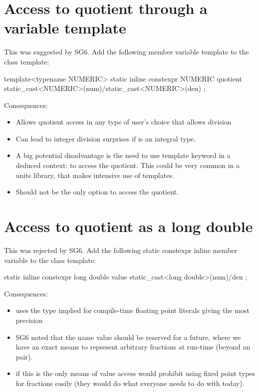 \documentclass[ebook,11pt,article]{memoir}
\begin{document}
\section{Access to quotient through a variable template}
This was suggested by SG6. Add the following member variable template to the  class template:
\begin{codeblock}
      template<typename NUMERIC>
      static inline constexpr NUMERIC quotient{
          static_cast<NUMERIC>(num)/static_cast<NUMERIC>(den)
      }; 
\end{codeblock}

Consequences:
\begin{itemize}
\item Allows quotient access in any type of user's choice that allows division
\item Can lead to integer division surprises if  is an integral type.
\item A big potential disadvantage is the need to use template keyword in a deduced context:
 to access the quotient. This could be very common in a units library, that makes intensive use of templates.
\item Should not be the only option to access the quotient.
\end{itemize}

\section{Access to quotient as a long double}
This was rejected by SG6. Add the following static constexpr inline member variable  to the  class template:
\begin{codeblock}
      static inline constexpr 
      long double value { static_cast<long double>(num)/den }; 
\end{codeblock}

Consequences:
\begin{itemize}
\item uses the type implied for compile-time floating point literals giving the most precision
\item SG6 noted that the name value should be reserved for a future, where we have an exact means to represent arbitrary fractions at run-time (beyond an  pair).
\item if this is the only means of value access would prohibit using fixed point types for fractions easily (they would do what everyone needs to do with  today).
\end{itemize}
\end{document}
